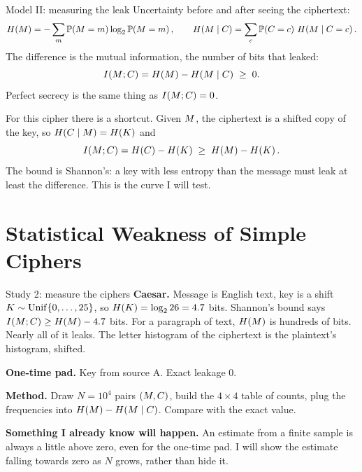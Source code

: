 \documentclass[10pt,aspectratio=169]{beamer}
\newcommand{\Unif}{\mathrm{Unif}}
\begin{document}
\begin{frame}{Model II: measuring the leak}
  Uncertainty before and after seeing the ciphertext:
  \[
    H\!\left(M\right) = -\sum_m \mathbb{P}\!\left(M=m\right)\log_2\mathbb{P}\!\left(M=m\right),
    \qquad
    H\!\left(M \mid C\right) = \sum_c \mathbb{P}\!\left(C=c\right)\,H\!\left(M \mid C = c\right).
  \]
  The difference is the mutual information, the number of bits that
  leaked:
  \[
    I\!\left(M ; C\right) = H\!\left(M\right) - H\!\left(M \mid C\right) \;\ge\; 0 .
  \]
  Perfect secrecy is the same thing as $I\!\left(M ; C\right) = 0$.
  \pause
  \medskip

  For this cipher there is a shortcut. Given $M$, the ciphertext is
  a shifted copy of the key, so $H\!\left(C \mid M\right) = H\!\left(K\right)$ and
  \[
    I\!\left(M ; C\right) = H\!\left(C\right) - H\!\left(K\right)
    \;\ge\; H\!\left(M\right) - H\!\left(K\right).
  \]
  The bound is Shannon's: a key with less entropy than the message
  must leak at least the difference. This is the curve I will test.
\end{frame}

\section[Weak ciphers]{Statistical Weakness of Simple Ciphers}

\begin{frame}{Study 2: measure the ciphers}
  \textbf{Caesar.} Message is English text, key is a shift
  $\key \sim \Unif\{0,\dots,25\}$, so $H\!\left(K\right) = \log_2 26 = 4.7$ bits.
  Shannon's bound says $I\!\left(M ; C\right) \ge H\!\left(M\right) - 4.7$ bits.
  For a paragraph of text, $H\!\left(M\right)$ is hundreds of bits. Nearly all
  of it leaks. The letter histogram of the ciphertext is the plaintext's
  histogram, shifted.
  \medskip

  \textbf{One-time pad.} Key from source A. Exact leakage $0$.
  \medskip

  \textbf{Method.} Draw $N = 10^4$ pairs $(M, C)$, build the
  $4 \times 4$ table of counts, plug the frequencies into
  $H\!\left(M\right) - H\!\left(M \mid C\right)$. Compare with the exact value.
  \medskip

  \textbf{Something I already know will happen.} An estimate from a
  finite sample is always a little above zero, even for the one-time
  pad. I will show the estimate falling towards zero as $N$ grows,
  rather than hide it.
\end{frame}

\end{document}
